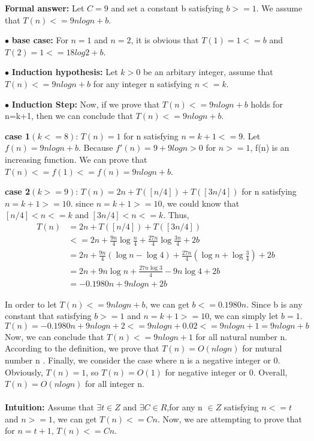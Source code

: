 \documentclass[12pt,a4paper]{article}
\newcommand{\question}[1]{\bigskip\noindent{\textbf{Q{#1} solution}}}
\begin{document}
	\noindent
	\textbf{Formal answer:}
	{Let $C=9$ and set a constant b satisfying $b>=1$.  We assume that $T(n)<=9nlogn+b$}.

		$\bullet$ \textbf{base case:}
		For $n=1$ and $n=2$, it is obvious that $T(1)=1<=b$ and $T(2)=1<=18log2+b$.


		$\bullet$ \textbf{Induction hypothesis:}
		Let $k>0$ be an arbitary integer, assume that $T(n)<=9nlogn+b$ for any integer n satisfying $n<=k$.

		
		$\bullet$ \textbf{Induction Step:}
		Now, if we prove that $T(n)<=9nlogn+b$ holds for n=k+1, then we can conclude that $T(n)<=9nlogn+b$.


		
		\textbf{case 1$(k<=8)$}:
		$T(n)=1$ for n satisfying $n=k+1<=9$. Let $f(n)=9nlogn+b$. Because $f'(n)=9+9logn>0$ for $n>=1$, f(n) is an increasing function. We can prove that $T(n)<=f(1)<=f(n)=9nlogn+b$.

		
		\textbf{case 2$(k>=9)$}:
		$T(n)=2n+T([n/4])+T([3n/4])$ for n satisfying $n=k+1>=10$. since $n=k+1>=10$, we could know that $[n/4]<n<=k$ and $[3n/4]<n<=k$. Thus, 
		\begin{align*}
 		T(n)&=2n+T([n/4])+T([3n/4]) \\
		&<=2n + \frac{9n}{4} \log{\frac{n}{4}} + \frac{27n}{4} \log{ \frac{3n}{4}}+2b\\
		&= 2n + \frac{9n}{4}(\log{n}-\log{4}) + \frac{27n}{4} ({ \log{n}+\log{\frac{3}{4}}})+2b\\
		&= 2n + 9n\log{n} + \frac{27n\log{3}}{4} - 9n\log{4} + 2b\\
		&= -0.1980n + 9nlogn + 2b
		\end{align*}

	
		In order to let $T(n)<=9nlogn + b$, we can get $b<=0.1980n$. Since b is any constant that satisfying $b>=1$ and $n=k+1>=10$, we can simply let $b=1$.
	$$ T(n)= -0.1980n+9nlogn+2 <= 9nlogn +0.02 <=9nlogn+1 =9nlogn + b$$
		Now, we can conclude that 	$T(n)<=9nlogn+1$ for all natural number n. According to the definition, we prove that $T(n)=O(nlogn)$ for nutural number n . Finally, we consider the case where n is a negative integer or 0. Obviously, $T(n)=1$, so $T(n)=O(1)$ for negative integer or 0. Overall, $T(n)=O(nlogn)$ for all integer n.\\\\


\question{3.B}
\textbf{Intuition:}
	{Assume that $\exists t \in Z$ and $\exists C \in R$,for any n $\in Z$ satisfying $n<=t$ and $n>=1$, we can get $T(n)<=Cn$. Now, we are attempting to prove that for $n=t+1$, $T(n)<=Cn$.}%
\end{document}
